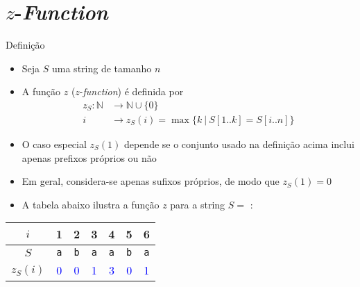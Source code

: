 \section{$z$-{\it Function}}

\begin{frame}[fragile]{Definição}

    \begin{itemize}
        \item Seja $S$ uma string de tamanho $n$

        \item A função $z$ ($z$-\textit{function}) é definida por
        \begin{align*}
            z_S: \mathbb{N} & \to \mathbb{N}\cup \lbrace 0\rbrace \\
               i & \to z_S(i) = \max\lbrace k\ |\ S[1..k] = S[i..n] \rbrace
        \end{align*}

        \item O caso especial $z_S(1)$ depende se o conjunto usado na definição acima inclui
            apenas prefixos próprios ou não

        \item Em geral, considera-se apenas sufixos próprios, de modo que $z_S(1) = 0$

        \item A tabela abaixo ilustra a função $z$ para a string $S = $ :
    \end{itemize}

    \begin{center}
        \begin{tabular}{c|cccccc}
        $i$ & 1 & 2 & 3 & 4 & 5 & 6 \\
        \hline
        $S$ & \texttt{\textcolor{red!80!black}{a}} & \texttt{\textcolor{red!80!black}{b}} & \texttt{\textcolor{red!80!black}{a}} & \texttt{\textcolor{red!80!black}{a}} & \texttt{\textcolor{red!80!black}{b}} & \texttt{\textcolor{red!80!black}{a}} \\
        $z_S(i)$ & \textcolor{blue}{0} & \textcolor{blue}{0} & \textcolor{blue}{1} & \textcolor{blue}{3} & \textcolor{blue}{0} & \textcolor{blue}{1} \\
        \end{tabular}
    \end{center}
\end{frame}

